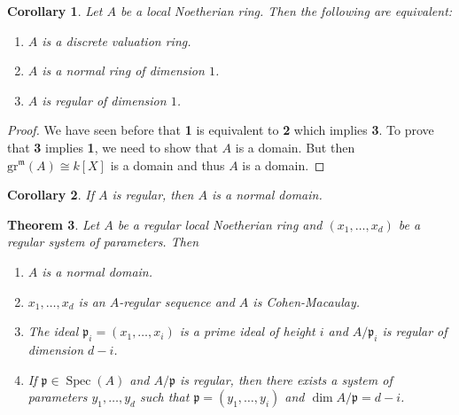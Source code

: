\documentclass[leqno, openany]{memoir}
\newtheorem{thm}{Theorem}[section]
\newtheorem{cor}[thm]{Corollary}
\theoremstyle{definition}
\theoremstyle{remark}
\theoremstyle{plain}
\theoremstyle{definition}
\theoremstyle{remark}
\newcommand{\mf}[1]{\mathfrak{#1}}
\newcommand{\mr}[1]{\mathrm{#1}}
\DeclareMathOperator{\Spec}{Spec}
\begin{document}
\begin{cor}
    Let $A$ be a local Noetherian ring. Then the following are equivalent:
    \begin{enumerate}
        \item $A$ is a discrete valuation ring.
        \item $A$ is a normal ring of dimension $1$.
        \item $A$ is regular of dimension $1$.
    \end{enumerate}
\end{cor}

\begin{proof}
    We have seen before that \textbf{1} is equivalent to \textbf{2} which implies \textbf{3}. To prove that \textbf{3} implies \textbf{1}, we need to show that $A$ is a domain. But then $\mr{gr}^{\mf{m}}(A) \cong k[X]$ is a domain and thus $A$ is a domain.    
\end{proof}

\begin{cor}
    If $A$ is regular, then $A$ is a normal domain.
\end{cor}

\begin{thm}
    Let $A$ be a regular local Noetherian ring and $(x_1, \ldots, x_d)$ be a regular system of parameters. Then
    \begin{enumerate}
        \item $A$ is a normal domain.
        \item $x_1, \ldots, x_d$ is an $A$-regular sequence and $A$ is Cohen-Macaulay.
        \item The ideal $\mf{p}_i = (x_1, \ldots, x_i)$ is a prime ideal of height $i$ and $A/ \mf{p}_i$ is regular of dimension $d-i$.
        \item If $\mf{p} \in \Spec(A)$ and $A/ \mf{p}$ is regular, then there exists a system of parameters $y_1, \ldots, y_d$ such that $\mf{p} = (y_1, \ldots, y_i)$ and $\dim A/\mf{p} = d-i$.
    \end{enumerate}
\end{thm}
\end{document}

